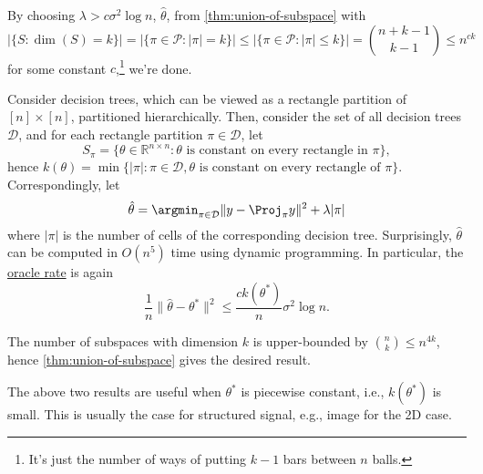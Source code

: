 \begin{explanation}
	By choosing \(\lambda > c \sigma ^2 \log n\), \(\hat{\theta} \), from \autoref{thm:union-of-subspace} with
	\[
		\vert \{ S \colon \dim (S) = k \} \vert
		= \vert \{\pi \in \mathcal{P} \colon \vert \pi \vert = k \} \vert
		\leq \vert \{\pi \in \mathcal{P} \colon \vert \pi \vert \leq k \} \vert
		= \binom{n+k-1}{k-1}
		\leq n^{ck}
	\]
	for some constant \(c\),\footnote{It's just the number of ways of putting \(k-1\) bars between \(n\) balls.} we're done.
\end{explanation}

\begin{eg}
	Consider decision trees, which can be viewed as a rectangle partition of \([n] \times [n]\), partitioned hierarchically. Then, consider the set of all decision trees \(\mathcal{D} \), and for each rectangle partition \(\pi \in \mathcal{D} \), let
	\[
		S_\pi = \{ \theta \in \mathbb{R} ^{n \times n} \colon \theta \text{ is constant on every rectangle in } \pi \},
	\]
	hence \(k(\theta )= \min \{ \vert \pi \vert \colon \pi \in \mathcal{D} , \theta \text{ is constant on every rectangle of } \pi \} \). Correspondingly, let
	\[
		\hat{\theta} = \argmin_{\pi \in \mathcal{D} } \lVert y - \Proj_\pi y \rVert ^2 + \lambda \vert \pi \vert
	\]
	where \(\vert \pi  \vert \) is the number of cells of the corresponding decision tree. Surprisingly, \(\hat{\theta} \) can be computed in \(O(n^5)\) time using dynamic programming. In particular, the \hyperref[not:oracle-rate]{oracle rate} is again
	\[
		\frac{1}{n} \lVert \hat{\theta} - \theta ^{\ast}  \rVert ^2
		\leq \frac{c k(\theta ^{\ast} )}{n} \sigma ^2 \log n.
	\]
\end{eg}
\begin{explanation}
	The number of subspaces with dimension \(k\) is upper-bounded by \(\binom{n}{k} \leq n^{4k}\), hence \autoref{thm:union-of-subspace} gives the desired result.
\end{explanation}

\begin{note}
	The above two results are useful when \(\theta ^{\ast} \) is piecewise constant, i.e., \(k(\theta ^{\ast} )\) is small. This is usually the case for structured signal, e.g., image for the 2D case.
\end{note}